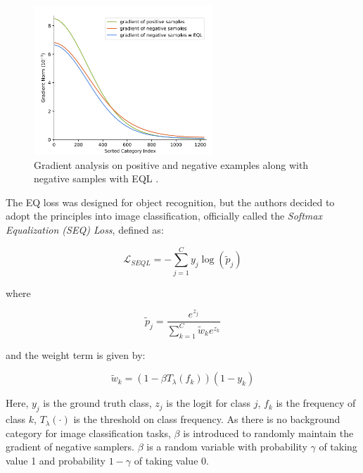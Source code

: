 \begin{figure}[ht]
    \centering
    \includegraphics[width=0.6\textwidth]{Images/gradient_analysis.png} 
    \caption{Gradient analysis on positive and negative examples along with negative samples with EQL \cite{tan2020equalizationlosslongtailedobject}.}
    \label{fig:eql_gradients} 
\end{figure}

The EQ loss was designed for object recognition, but the authors decided to adopt the principles into image classification, officially called the \emph{Softmax Equalization (SEQ) Loss}, defined as: 

\begin{equation}
    \label{eq:EQ_loss}
    \mathcal{L}_{SEQL} = - \sum_{j=1}^{C} y_j \log(\tilde{p}_j)
\end{equation}

\noindent where

\begin{equation}
    \tilde{p}_j = \frac{e^{z_j}}{\sum_{k=1}^{C} \tilde{w}_k e^{z_k}}
\end{equation}

\noindent and the weight term is given by:

\begin{equation}
    \tilde{w}_k = (1 - \beta T_\lambda(f_k))(1 - y_k)
\end{equation}

\noindent Here, $y_j$ is the ground truth class, $z_j$ is the logit for class $j$, $f_k$ is the frequency of class $k$, \(T_\lambda(\cdot)\) is the threshold on class frequency. As there is no background category for image classification tasks, $\beta$ is introduced to randomly maintain the gradient of negative samplers. \(\beta\) is a random variable with probability \(\gamma\) of taking value 1 and probability \(1 - \gamma\) of taking value 0.


